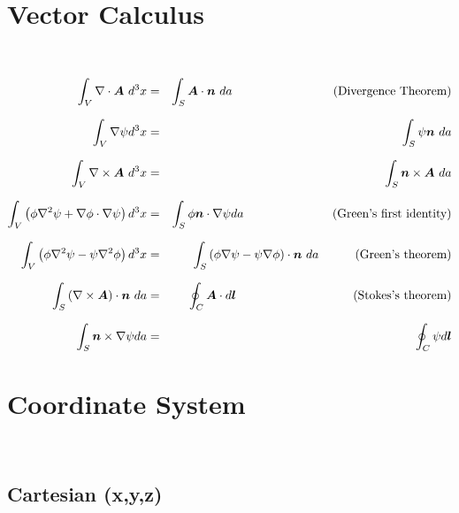 \clearpage

\section{Vector Calculus}
~~~~
\bigskip

\begin{eqnarray}
\int_{V} \nabla \cdot \vA ~d^{3}x &=& \int_{S} \vA \cdot \vn ~da 
\textrm{~~~~~~~~~~~~~~~~~~~~~~~~~(Divergence Theorem)} \nonumnext
\int_{V} \nabla \psi d^{3}x &=& \int_{S} \psi \vn ~da  \nonumnext
\int_{V} \nabla \times \vA ~d^{3}x &=& \int_{S} \vn \times \vA ~da \nonumnext 
\int_{V} \left( \phi \nabla^{2}\psi + \nabla\phi \cdot \nabla\psi \right) d^{3}x &=&
\int_{S} \phi \vn\cdot\nabla\psi da
\textrm{~~~~~~~~~~~~~~~~~~~~~~(Green's first identity)} \nonumnext
\int_{V} \left( \phi \nabla^{2}\psi - \psi\nabla^{2}\phi \right) d^{3}x &=&
\int_{S} \left( \phi\nabla\psi - \psi\nabla\phi \right) \cdot \vn ~da 
\textrm{~~~~~~~~~(Green's theorem)} \nonumnext
\int_{S} \left( \nabla \times \vA \right) \cdot \vn ~da &=& \oint_{C} \vA \cdot d\vl 
\textrm{~~~~~~~~~~~~~~~~~~~~~~~~~~~~~(Stokes's theorem)} \nonumnext
\int_{S} \vn \times \nabla \psi da &=& \oint_{C} \psi d\vl \nonumber
\end{eqnarray}

\clearpage

\section{Coordinate System}

~~~~
\bigskip
\subsection{Cartesian (x,y,z)}

